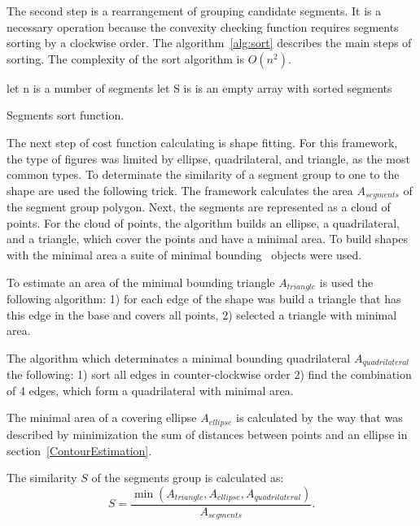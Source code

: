 \documentclass{lutmscthesis}[2010/09/22]
\begin{document}
The second step is a rearrangement of grouping candidate segments. It is a necessary operation because the convexity checking function requires segments sorting by a clockwise order. The algorithm~\ref{alg:sort} describes the main steps of sorting. The complexity of the sort algorithm is $O(n^2)$.


\begin{algorithm} [H]
    \SetAlgoLined
    let n is a number of segments\;
    let S is is an empty array with sorted segments\;
\caption{Segments sort function.}\label{alg:sort}
\end{algorithm}

The next step of cost function calculating is shape fitting. For this framework, the type of figures was limited by ellipse, quadrilateral, and triangle, as the most common types. To determinate the similarity of a segment group to one to the shape are used the following trick. The framework calculates the area $A_{segments}$ of the segment group polygon. Next, the segments are represented as a cloud of points. For the cloud of points, the algorithm builds an ellipse, a quadrilateral, and a triangle, which cover the points and have a minimal area. To build shapes with the minimal area a suite of minimal bounding~\cite{suite} objects were used. 

To estimate an area of the minimal bounding triangle $A_{triangle}$ is used the following algorithm: 1) for each edge of the shape was build a triangle that has this edge in the base and covers all points, 2) selected a triangle with minimal area.

The algorithm which determinates a minimal bounding quadrilateral $A_{quadrilateral}$ the following: 1) sort all edges in counter-clockwise order 2) find the combination of 4 edges, which form a  quadrilateral with minimal area.

The minimal area of a covering ellipse $A_{ellipse}$ is calculated by the way that was described by minimization the sum of distances between points and an ellipse in section~\ref{ContourEstimation}.

The similarity $S$ of the segments group is calculated as: 
\begin{equation}
    S = \frac{\min(A_{triangle},A_{ellipse},A_{quadrilateral})}{A_{segments}}.
    \label{eq:simularity cost}
\end{equation}
\end{document}

